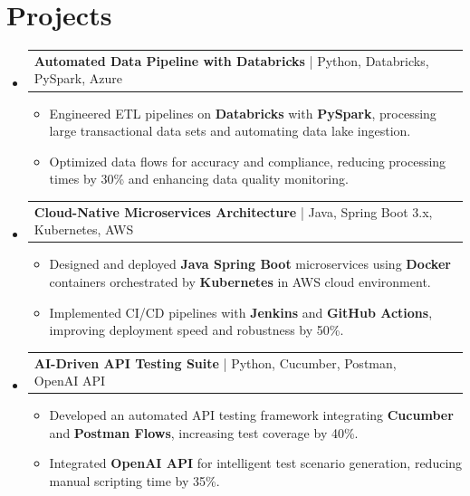 \documentclass[letterpaper,11pt]{article}
\makeatletter
\newcommand{\resumeItem}[1]{
  \item\footnotesize{
    {#1 \vspace{-2pt}}
  }
}
\newcommand{\resumeProjectHeading}[2]{
    \item
    \begin{tabular*}{1.001\textwidth}{l@{\extracolsep{\fill}}r}
      \small#1 & \textbf{\small #2}\\
    \end{tabular*}\vspace{-7pt}
}
\newcommand{\resumeSubHeadingListStart}{\begin{itemize}[leftmargin=0pt, label={}]}
\newcommand{\resumeSubHeadingListEnd}{\end{itemize}}
\newcommand{\resumeItemListStart}{\begin{itemize}[leftmargin=*]}
\newcommand{\resumeItemListEnd}{\end{itemize}\vspace{-5pt}}
\makeatother
\begin{document}
\section{Projects}
    \vspace{-5pt}
    \resumeSubHeadingListStart
          \resumeProjectHeading
              {\textbf{Automated Data Pipeline with Databricks} | Python, Databricks, PySpark, Azure}{}
        \resumeItemListStart
            \resumeItem{Engineered ETL pipelines on \textbf{Databricks} with \textbf{PySpark}, processing large transactional data sets and automating data lake ingestion.}
            \resumeItem{Optimized data flows for accuracy and compliance, reducing processing times by 30\% and enhancing data quality monitoring.}
        \resumeItemListEnd
        \vspace{-12pt}
    
    \resumeProjectHeading
        {\textbf{Cloud-Native Microservices Architecture} | Java, Spring Boot 3.x, Kubernetes, AWS}{}
        \resumeItemListStart
            \resumeItem{Designed and deployed \textbf{Java Spring Boot} microservices using \textbf{Docker} containers orchestrated by \textbf{Kubernetes} in AWS cloud environment.}
            \resumeItem{Implemented CI/CD pipelines with \textbf{Jenkins} and \textbf{GitHub Actions}, improving deployment speed and robustness by 50\%.}
        \resumeItemListEnd
          \vspace{-12pt}
      \resumeProjectHeading
          {\textbf{AI-Driven API Testing Suite} | Python, Cucumber, Postman, OpenAI API}{}
          \resumeItemListStart
              \resumeItem{Developed an automated API testing framework integrating \textbf{Cucumber} and \textbf{Postman Flows}, increasing test coverage by 40\%.}
              \resumeItem{Integrated \textbf{OpenAI API} for intelligent test scenario generation, reducing manual scripting time by 35\%.}
          \resumeItemListEnd 
    \resumeSubHeadingListEnd
\end{document}
